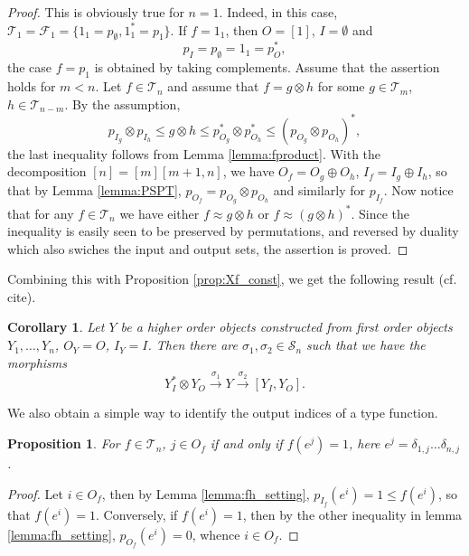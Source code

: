 \documentclass[12pt]{article}
\newtheorem{coro}{Corollary}
\newtheorem{prop}{Proposition}
\theoremstyle{definition}
\theoremstyle{remark}
\def\Te{\mathcal T}
\def\Fe{\mathcal F}
\def\permut{\mathscr{S}}
\begin{document}
\begin{proof} This is obviously true for $n=1$. Indeed, in this case,
$\Te_1=\Fe_1=\{1_1=p_\emptyset,1_1^*=p_{1}\}$. If $f=1_1$, then $O=[1]$, $I=\emptyset$ and 
\[
p_I=p_{\emptyset}=1_1=p_O^*,
\]
the case  $f=p_1$ is obtained by taking complements. Assume that the assertion holds for
$m<n$. Let $f\in \Te_n$ and assume that  $f=g\otimes h$ for some  $g\in
\Te_m$, $h\in \Te_{n-m}$.  By the assumption,
\[
p_{I_g}\otimes p_{I_h}\le g\otimes h\le p^*_{O_g}\otimes p^*_{O_h}\le (p_{O_g}\otimes
p_{O_h})^*,
\]
the last inequality follows from Lemma \ref{lemma:fproduct}. With the decomposition
$[n]=[m][m+1,n]$, we have   
$O_f=O_g\oplus O_h$, $I_f=I_g\oplus I_h$, so that by Lemma \ref{lemma:PSPT}, 
$p_{O_f}=p_{O_g}\otimes p_{O_h}$ and
similarly for $p_{I_f}$. Now notice that for any $f\in \Te_n$ we have either $f\approx g\otimes
h$ or $f\approx (g\otimes h)^*$. Since the inequality is easily seen to be preserved by
permutations, and reversed by duality which also swiches the input and output sets, the
assertion is proved.

\end{proof}


Combining this with Proposition \ref{prop:Xf_const}, we get the following result
(cf. cite). 

\begin{coro}\label{coro:setting} Let $Y$ be a higher order objects constructed from
first order objects $Y_1,\dots, Y_n$,  $O_Y=O$,
$I_Y=I$.  Then there are
$\sigma_1,\sigma_2\in \permut_n$ such that we have the  morphisms 
\[
Y_I^*\otimes Y_O\xrightarrow{\sigma_1} Y
\xrightarrow{\sigma_2} [Y_I, Y_O].
\]
 


\end{coro}



We also obtain  a simple  way to identify the output indices  of a type
function.

\begin{prop}\label{prop:fh_outputs} For $f\in \Te_n$, $j\in O_f$ if and only if
$f(e^j)=1$, here $e^j=\delta_{1,j}\dots\delta_{n,j}$.


\end{prop}


\begin{proof} Let $i\in O_f$, then by Lemma \ref{lemma:fh_setting}, $p_{I_f}(e^i)=1\le
f(e^i)$, so that $f(e^i)=1$. Conversely, if $f(e^i)=1$, then by the other inequality in
lemma \ref{lemma:fh_setting}, $p_{O_f}(e^i)=0$, whence $i\in O_f$.


\end{proof}
\end{document}
